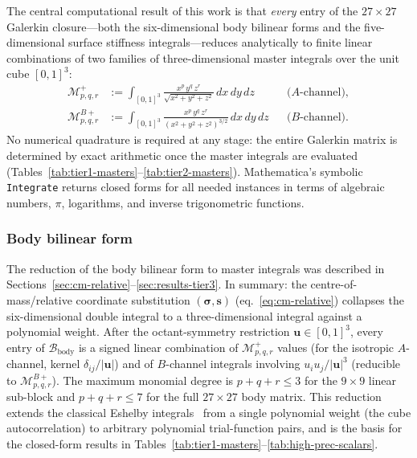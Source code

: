 The central computational result of this work is that \emph{every}
entry of the $27 \times 27$ Galerkin closure---both the six-dimensional
body bilinear forms and the five-dimensional surface stiffness
integrals---reduces analytically to finite linear combinations of two
families of three-dimensional master integrals over the unit cube
$[0,1]^3$:
\begin{align}
  \mathcal{M}^+_{p,q,r}
    &:= \int_{[0,1]^3}\!\frac{x^p\,y^q\,z^r}
         {\sqrt{x^2+y^2+z^2}}\,dx\,dy\,dz
    &&\text{($A$-channel)},
    \label{eq:Mp-def} \\
  \mathcal{M}^{B+}_{p,q,r}
    &:= \int_{[0,1]^3}\!\frac{x^p\,y^q\,z^r}
         {(x^2+y^2+z^2)^{3/2}}\,dx\,dy\,dz
    &&\text{($B$-channel)}.
    \label{eq:MpB-def}
\end{align}
No numerical quadrature is required at any stage: the entire Galerkin
matrix is determined by exact arithmetic once the master integrals are
evaluated (Tables~\ref{tab:tier1-masters}--\ref{tab:tier2-masters}).
Mathematica's symbolic \texttt{Integrate} returns closed forms for all
needed instances in terms of algebraic numbers, $\pi$, logarithms, and
inverse trigonometric functions.

\subsubsection*{Body bilinear form}

The reduction of the body bilinear form to master integrals was
described in
Sections~\ref{sec:cm-relative}--\ref{sec:results-tier3}.  In summary:
the centre-of-mass/relative coordinate substitution
$(\bm{\sigma},\bm{s})$ (eq.~\eqref{eq:cm-relative}) collapses the
six-dimensional double integral to a three-dimensional integral against
a polynomial weight.  After the octant-symmetry restriction
$\bm{u} \in [0,1]^3$, every entry of
$\mathcal{B}_{\mathrm{body}}$ is a signed linear combination of
$\mathcal{M}^+_{p,q,r}$ values (for the isotropic $A$-channel,
kernel $\delta_{ij}/|\bm{u}|$) and of $B$-channel integrals involving
$u_i u_j / |\bm{u}|^3$ (reducible to $\mathcal{M}^{B+}_{p,q,r}$).
The maximum monomial degree is $p+q+r \le 3$ for the $9{\times}9$
linear sub-block and $p+q+r \le 7$ for the full $27{\times}27$ body
matrix.  This reduction extends the classical Eshelby
integrals~\cite{mura1987} from a single polynomial weight (the cube
autocorrelation) to arbitrary polynomial trial-function pairs, and is
the basis for the closed-form results in
Tables~\ref{tab:tier1-masters}--\ref{tab:high-prec-scalars}.

